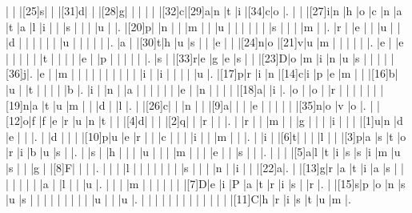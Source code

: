 \documentclass[12pt]{article}
\begin{document}
\begin{Puzzle}{22}{24}
  |{}  |{}  |[25]s|{}  |{}  |[31]d|{}  |{}  |[28]g|{}  |{}  |{}  |{}  |{}  |[32]c|[29]a|n   |t   |i   |[34]c|o   |.
  |{}  |{}  |[27]i|n   |h   |o   |c   |n   |a   |t   |a   |l   |i   |{}  |{}  |s   |{}  |{}  |{}  |u   |{}  |.
  |[20]p|{}  |n   |{}  |{}  |m   |{}  |{}  |u   |{}  |{}  |{}  |{}  |{}  |{}  |s   |{}  |{}  |{}  |m   |{}  |.
  |r   |{}  |e   |{}  |{}  |u   |{}  |{}  |d   |{}  |{}  |{}  |{}  |{}  |{}  |u   |{}  |{}  |{}  |{}  |{}  |.
  |a   |{}  |[30]t|h   |u   |s   |{}  |{}  |e   |{}  |{}  |[24]n|o   |[21]v|u   |m   |{}  |{}  |{}  |{}  |{}  |.
  |e   |{}  |e   |{}  |{}  |{}  |{}  |{}  |t   |{}  |{}  |{}  |{}  |e   |{}  |p   |{}  |{}  |{}  |{}  |{}  |.
  |s   |{}  |[33]r|e   |g   |e   |s   |{}  |{}  |[23]D|o   |m   |i   |n   |u   |s   |{}  |{}  |{}  |{}  |[36]j|.
  |e   |{}  |m   |{}  |{}  |{}  |{}  |{}  |{}  |{}  |{}  |{}  |{}  |i   |{}  |i   |{}  |{}  |{}  |{}  |u   |.
  |[17]p|r   |i   |n   |[14]c|i   |p   |e   |m   |{}  |{}  |[16]b|{}  |u   |{}  |t   |{}  |{}  |{}  |{}  |b   |.
  |i   |{}  |n   |{}  |a   |{}  |{}  |{}  |{}  |{}  |{}  |e   |{}  |n   |{}  |{}  |{}  |{}  |[18]a|{}  |i   |.
  |o   |{}  |o   |{}  |r   |{}  |{}  |{}  |{}  |{}  |{}  |[19]n|a   |t   |u   |m   |{}  |{}  |d   |{}  |l   |.
  |{}  |[26]c|{}  |{}  |n   |{}  |{}  |[9]a|{}  |{}  |{}  |e   |{}  |{}  |{}  |{}  |{}  |[35]n|o   |v   |o   |.
  |{}  |[12]o|f   |f   |e   |r   |u   |n   |t   |{}  |{}  |[4]d|{}  |{}  |{}  |[2]q|{}  |{}  |r   |{}  |{}  |.
  |{}  |r   |{}  |{}  |m   |{}  |{}  |g   |{}  |{}  |{}  |i   |{}  |{}  |{}  |[1]u|n   |d   |e   |{}  |{}  |.
  |{}  |d   |{}  |{}  |{}  |[10]p|u   |e   |r   |{}  |{}  |c   |{}  |{}  |{}  |i   |{}  |{}  |m   |{}  |{}  |.
  |{}  |i   |{}  |[6]t|{}  |{}  |{}  |l   |{}  |{}  |[3]p|a   |s   |t   |o   |r   |i   |b   |u   |s   |{}  |.
  |{}  |s   |{}  |h   |{}  |{}  |{}  |u   |{}  |{}  |{}  |m   |{}  |{}  |{}  |e   |{}  |{}  |s   |{}  |{}  |.
  |{}  |{}  |{}  |[5]a|l   |t   |i   |s   |s   |i   |m   |u   |s   |{}  |{}  |g   |{}  |[8]F|{}  |{}  |{}  |.
  |{}  |{}  |{}  |l   |{}  |{}  |{}  |{}  |{}  |{}  |{}  |s   |{}  |{}  |{}  |n   |{}  |i   |{}  |{}  |[22]a|.
  |{}  |[13]g|r   |a   |t   |i   |a   |s   |{}  |{}  |{}  |{}  |{}  |{}  |{}  |a   |{}  |l   |{}  |{}  |u   |.
  |{}  |{}  |{}  |m   |{}  |{}  |{}  |{}  |{}  |{}  |[7]D|e   |i   |P   |a   |t   |r   |i   |s   |{}  |r   |.
  |{}  |[15]s|p   |o   |n   |s   |u   |s   |{}  |{}  |{}  |{}  |{}  |{}  |{}  |{}  |{}  |u   |{}  |{}  |u   |.
  |{}  |{}  |{}  |{}  |{}  |{}  |{}  |{}  |{}  |{}  |{}  |{}  |{}  |[11]C|h   |r   |i   |s   |t   |u   |m   |.
\end{Puzzle}
\end{document}
